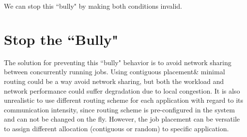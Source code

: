 \documentclass[conference,compsoc]{IEEEtran}
\begin{document}
We can stop this ``bully" by making both conditions invalid. 


\section{Stop the ``Bully"}

The solution for preventing this ``bully" behavior is to avoid network sharing between concurrently running jobs. Using contiguous placement\& minimal routing could be a way avoid network sharing, but both the workload and network performance could suffer degradation due to local congestion. It is also unrealistic to use different routing scheme for each application with regard to its communication intensity, since routing scheme is pre-configured in the system and can not be changed on the fly. However, the job placement can be versatile to assign different allocation (contiguous or random) to specific application.
\end{document}
